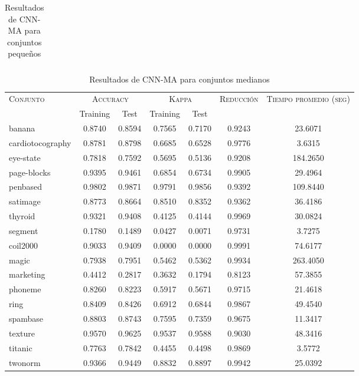 \begin{table}[]
\begin{tabular}{l c c c c c c}
\hline
\end{tabular}
\caption{Resultados de CNN-MA para conjuntos pequeños }
\label{res-peq-CNN-MA}
\end{table}


\begin{table}[]
\centering
\begin{tabular}{l c c c c c c}
\hline
\multirow{2}{*}{\textsc{Conjunto}}
	& \multicolumn{2}{c}{\textsc{Accuracy}}
	& \multicolumn{2}{c}{\textsc{Kappa}}
	& \textsc{Reducción}
	& \textsc{Tiempo promedio (seg)} \\
	& Training & Test
	& Training & Test \\ 
\hline
\hline

banana & 0.8740 & 0.8594 & 0.7565 & 0.7170 & 0.9243 & 23.6071 \\
cardiotocography & 0.8781 & 0.8798 & 0.6685 & 0.6528 & 0.9776 & 3.6315 \\
eye-state & 0.7818 & 0.7592 & 0.5695 & 0.5136 & 0.9208 & 184.2650 \\
page-blocks & 0.9395 & 0.9461 & 0.6854 & 0.6734 & 0.9905 & 29.4964 \\
penbased & 0.9802 & 0.9871 & 0.9791 & 0.9856 & 0.9392 & 109.8440 \\
satimage & 0.8773 & 0.8664 & 0.8510 & 0.8352 & 0.9362 & 36.4186 \\
thyroid & 0.9321 & 0.9408 & 0.4125 & 0.4144 & 0.9969 & 30.0824 \\
segment & 0.1780 & 0.1489 & 0.0427 & 0.0071 & 0.9731 & 3.7275 \\
coil2000 & 0.9033 & 0.9409 & 0.0000 & 0.0000 & 0.9991 & 74.6177 \\
magic & 0.7938 & 0.7951 & 0.5462 & 0.5362 & 0.9934 & 263.4050 \\
marketing & 0.4412 & 0.2817 & 0.3632 & 0.1794 & 0.8123 & 57.3855 \\
phoneme & 0.8260 & 0.8223 & 0.5917 & 0.5671 & 0.9715 & 21.4618 \\
ring & 0.8409 & 0.8426 & 0.6912 & 0.6844 & 0.9867 & 49.4540 \\
spambase & 0.8803 & 0.8743 & 0.7595 & 0.7359 & 0.9675 & 11.3417 \\
texture & 0.9570 & 0.9625 & 0.9537 & 0.9588 & 0.9030 & 48.3416 \\
titanic & 0.7763 & 0.7842 & 0.4455 & 0.4498 & 0.9869 & 3.5772 \\
twonorm & 0.9366 & 0.9449 & 0.8832 & 0.8897 & 0.9942 & 25.0392 \\

\hline
\end{tabular}
\caption{Resultados de CNN-MA para conjuntos medianos }
\label{res-med-CNN-MA}
\end{table}


